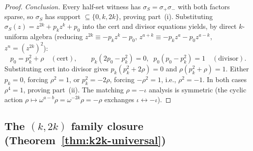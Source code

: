 \documentclass[11pt]{article}
\theoremstyle{definition}
\theoremstyle{remark}
\begin{document}
\begin{proof}
\emph{Conclusion.}
Every half-set witness has $\sigma_S = \sigma_+ \sigma_-$ with both
factors sparse, so $\sigma_S$ has support $\subseteq \{0, k, 2k\}$,
proving part~(i). Substituting $\sigma_S(z) = z^{2k} + p_k z^k + p_0$
into the cert and divisor equations yields, by direct $k$-uniform
algebra (reducing $z^{2k} \equiv -p_k z^k - p_0$, $z^{a+k} \equiv
-p_k z^a - p_0 z^{a-k}$, $z^n = (z^{2k})^2$):
\[
 p_0 = p_k^2 + \rho \quad (\text{cert}), \qquad
 p_k(2 p_0 - p_k^2) = 0,\;\;
 p_0(p_0 - p_k^2) = 1 \quad (\text{divisor}).
\]
Substituting cert into divisor gives $p_k(p_k^2 + 2\rho) = 0$ and
$\rho(p_k^2 + \rho) = 1$. Either $p_k = 0$, forcing $\rho^2 = 1$, or
$p_k^2 = -2\rho$, forcing $-\rho^2 = 1$, i.e., $\rho^2 = -1$. In both
cases $\rho^4 = 1$, proving part~(ii). The matching $\rho = -\iota$
analysis is symmetric (the cyclic action $\rho \mapsto \omega^{a - b} \rho
= \omega^{-2k}\rho = -\rho$ exchanges $\iota \leftrightarrow -\iota$).
\end{proof}

\subsection{The $(k, 2k)$ family closure (Theorem~\ref{thm:k2k-universal})}
\label{prf:thm:k2k-universal}
\end{document}
